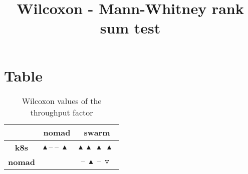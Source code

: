 \documentclass{article}
\title{Wilcoxon - Mann-Whitney rank sum test}
\author{}
\begin{document}
\maketitle
\section{Table}
\begin{table}[!htp]
  \caption{Wilcoxon values of the throughput factor}
  \label{table:throughput}
  \centering
  \begin{scriptsize}
  \begin{tabular}{c|cc}
      & \textbf{nomad} & \textbf{swarm} \\\hline
      \textbf{k8s} & $\blacktriangle\ \text{--}\ \text{--}\ \blacktriangle\  $ & $ \blacktriangle\ \blacktriangle\ \blacktriangle\ \blacktriangle\ $ \\
      \textbf{nomad} & $ $ & $ \text{--}\ \blacktriangle\ \text{--}\ \triangledown\ $ \\
  \end{tabular}
  \end{scriptsize}
\end{table}
\end{document}
